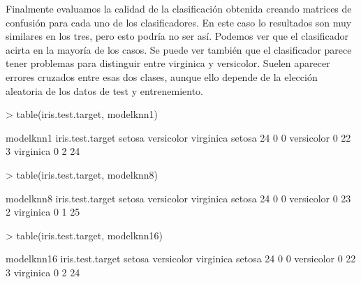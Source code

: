 \documentclass [a4paper] {article}
\begin{document}
Finalmente evaluamos la calidad de la clasificación obtenida creando matrices de confusión para cada uno de los clasificadores.
En este caso lo resultados son muy similares en los tres, pero esto podría no ser así.
Podemos ver que el clasificador acirta en la mayoría de los casos.
Se puede ver también que el clasificador parece tener problemas para distinguir entre virginica y versicolor.
Suelen aparecer errores cruzados entre esas dos clases, aunque ello depende de la elección aleatoria de los datos de test y entrenemiento.
\begin{Schunk}
\begin{Sinput}
> table(iris.test.target, modelknn1)
\end{Sinput}
\begin{Soutput}
                modelknn1
iris.test.target setosa versicolor virginica
      setosa         24          0         0
      versicolor      0         22         3
      virginica       0          2        24
\end{Soutput}
\begin{Sinput}
> table(iris.test.target, modelknn8)
\end{Sinput}
\begin{Soutput}
                modelknn8
iris.test.target setosa versicolor virginica
      setosa         24          0         0
      versicolor      0         23         2
      virginica       0          1        25
\end{Soutput}
\begin{Sinput}
> table(iris.test.target, modelknn16)
\end{Sinput}
\begin{Soutput}
                modelknn16
iris.test.target setosa versicolor virginica
      setosa         24          0         0
      versicolor      0         22         3
      virginica       0          2        24
\end{Soutput}
\end{Schunk}

\newpage
\end{document}

